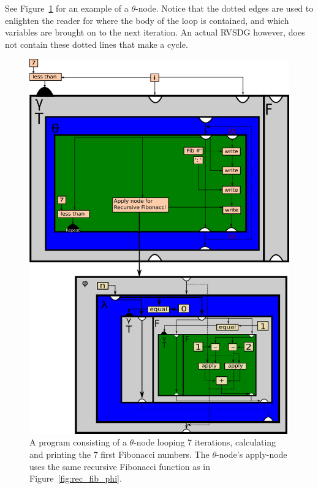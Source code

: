 \begin{itemize}
See Figure~\ref{fig:for_loop_rec_fib_print_ex} for an example of a
$\theta$-node. Notice that the dotted edges are used to enlighten the reader for
where the body of the loop is contained, and which variables are brought on to
the next iteration. An actual RVSDG however, does not contain these dotted lines
that make a cycle.


\clearpage
\begin{figure}[ht!]
	\centering
	\includegraphics[width=\textwidth]{figures/for-loop-printf-rec_fib-example}
	\caption{A program consisting of a $\theta$-node looping 7 iterations,
calculating and printing the 7 first Fibonacci numbers. The $\theta$-node's
apply-node uses the same recursive Fibonacci function as in
Figure~\ref{fig:rec_fib_phi}.}
	\label{fig:for_loop_rec_fib_print_ex}
\end{figure}


\end{itemize}
